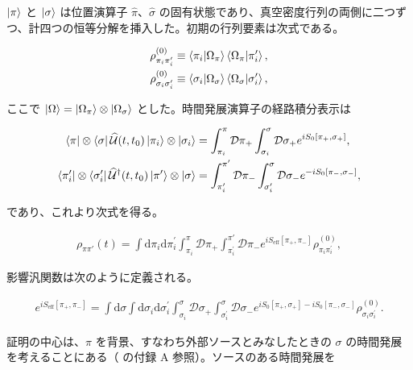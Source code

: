 \documentclass[a4paper,11pt]{ltjsarticle}
\numberwithin{equation}{section}
\newcommand{\dd}{\mathrm{d}}
\newcommand{\ee}{e}
\begin{document}
$\ket{\pi}$ と $\ket{\sigma}$ は位置演算子 $\widehat{\pi}$、$\widehat{\sigma}$ の固有状態であり、真空密度行列の両側に二つずつ、計四つの恒等分解を挿入した。初期の行列要素は次式である。

\begin{align}
    \rho^{(0)}_{\pi_i \pi_i^\prime} &\equiv \braket{\pi_i|\Omega_\pi} \braket{\Omega_\pi|\pi_i^\prime}, \\
    \rho^{(0)}_{\sigma_i \sigma_i^\prime} &\equiv \braket{\sigma_i|\Omega_\sigma} \braket{\Omega_\sigma|\sigma_i^\prime},
\end{align}

ここで $\ket{\Omega}=\ket{\Omega_\pi}\otimes\ket{\Omega_\sigma}$ とした。時間発展演算子の経路積分表示は

\begin{align}
    \bra{\pi} \otimes \bra{\sigma}  \widehat{\mathcal{U}}(t,t_0) \ket{\pi_i} \otimes \ket{\sigma_i} &= \int_{\pi_i}^\pi \mathcal{D}\pi_+ \int_{\sigma_i}^\sigma \mathcal{D}\sigma_+  \ee^{i S_0\left[\pi_+,\sigma_+ \right]}, \\
    \bra{\pi_i^\prime} \otimes \bra{\sigma_i^\prime} \widehat{\mathcal{U}}^\dag(t,t_0)\ket{\pi'} \otimes \ket{\sigma}  &= \int_{\pi_i^\prime}^{\pi'} \mathcal{D}\pi_- \int_{\sigma_i^\prime}^\sigma \mathcal{D}\sigma_-  \ee^{-i S_0\left[\pi_-,\sigma_- \right]},
\end{align}

であり、これより次式を得る。

\begin{align}
    \rho_{\pi \pi'} (t) = \int \dd \pi_i \dd \pi_i^\prime \int_{\pi_i}^\pi \mathcal{D}\pi_+ \int_{\pi_i^\prime}^{\pi'} \mathcal{D}\pi_- \ee^{i S_{\mathrm{eff}}\left[ \pi_+, \pi_-\right]} \rho^{(0)}_{\pi_i \pi_i^\prime},
\end{align}

影響汎関数は次のように定義される。

\begin{align}
     \ee^{i S_{\mathrm{eff}}\left[ \pi_+, \pi_-\right]} = \int \dd \sigma \int \dd \sigma_i \dd \sigma_i^\prime  \int_{\sigma_i}^\sigma \mathcal{D}\sigma_+ \int_{\sigma_i^\prime}^\sigma \mathcal{D}\sigma_-  \ee^{i S_0\left[\pi_+,\sigma_+ \right]-i S_0\left[\pi_-,\sigma_- \right]} \rho^{(0)}_{\sigma_i \sigma_i^\prime}.
\end{align}

証明の中心は、$\pi$ を背景、すなわち外部ソースとみなしたときの $\sigma$ の時間発展を考えることにある（\cite{Glorioso:2016gsa} の付録 A 参照）。ソースのある時間発展を
\end{document}
